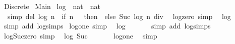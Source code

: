 %
\begin{isabellebody}%
\def\isabellecontext{Discrete}%
%
\isamarkuptrue%
%
\isadelimtheory
%
\endisadelimtheory
%
\isatagtheory
{}\isamarkupfalse%
\ Discrete\isanewline
{}\ Main\isanewline
{}%
\endisatagtheory
{\isafoldtheory}%
%
\isadelimtheory
%
\endisadelimtheory
%
\isamarkuptrue%
\isamarkupfalse%
\ log\ {\isacharcolon}{\isacharcolon}\ {\isachardoublequoteopen}nat\ {\isasymRightarrow}\ nat{\isachardoublequoteclose}\ \isanewline
\ \ {\isacharbrackleft}simp\ del{\isacharbrackright}{\isacharcolon}\ {\isachardoublequoteopen}log\ n\ {\isacharequal}\ {\isacharparenleft}if\ n\ {\isacharless}\ {}\ then\ {}\ else\ Suc\ {\isacharparenleft}log\ {\isacharparenleft}n\ div\ {}{\isacharparenright}{\isacharparenright}{\isacharparenright}{\isachardoublequoteclose}\isanewline
\isanewline
{}\isamarkupfalse%
\ log{\isacharunderscore}zero\ {\isacharbrackleft}simp{\isacharbrackright}{\isacharcolon}\isanewline
\ \ {\isachardoublequoteopen}log\ {}\ {\isacharequal}\ {}{\isachardoublequoteclose}\isanewline
%
\isadelimproof
\ \ %
\endisadelimproof
%
\isatagproof
{}\isamarkupfalse%
\ {\isacharparenleft}simp\ add{\isacharcolon}\ log{\isachardot}simps{\isacharparenright}%
\endisatagproof
{\isafoldproof}%
%
\isadelimproof
\isanewline
%
\endisadelimproof
\isanewline
{}\isamarkupfalse%
\ log{\isacharunderscore}one\ {\isacharbrackleft}simp{\isacharbrackright}{\isacharcolon}\isanewline
\ \ {\isachardoublequoteopen}log\ {}\ {\isacharequal}\ {}{\isachardoublequoteclose}\isanewline
%
\isadelimproof
\ \ %
\endisadelimproof
%
\isatagproof
{}\isamarkupfalse%
\ {\isacharparenleft}simp\ add{\isacharcolon}\ log{\isachardot}simps{\isacharparenright}%
\endisatagproof
{\isafoldproof}%
%
\isadelimproof
\isanewline
%
\endisadelimproof
\isanewline
{}\isamarkupfalse%
\ log{\isacharunderscore}Suc{\isacharunderscore}zero\ {\isacharbrackleft}simp{\isacharbrackright}{\isacharcolon}\isanewline
\ \ {\isachardoublequoteopen}log\ {\isacharparenleft}Suc\ {}{\isacharparenright}\ {\isacharequal}\ {}{\isachardoublequoteclose}\isanewline
%
\isadelimproof
\ \ %
\endisadelimproof
%
\isatagproof
{}\isamarkupfalse%
\ log{\isacharunderscore}one\ \isamarkupfalse%
\ simp%
\endisatagproof
{\isafoldproof}%

\end{isabellebody}
